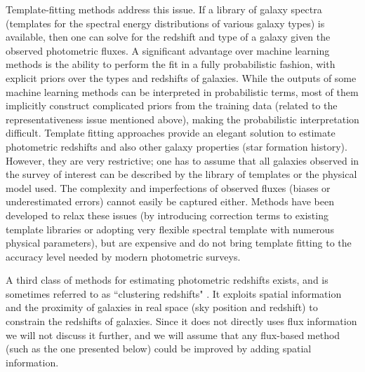 \documentclass[aps,prd,showpacs,superscriptaddress,groupedaddress]{revtex4}  %
\begin{document}
Template-fitting methods \citep[\eg][]{Benitez:1998br, Brammer:2008qv, Feldmann:2006wg}  address this issue. 
If a library of galaxy spectra (\ie templates for the spectral energy distributions of various galaxy types) is available, then one can solve for the redshift and type of a galaxy given the observed photometric fluxes.
A significant advantage over machine learning methods is the ability to perform the fit in a fully probabilistic fashion, with explicit priors over the types and redshifts of galaxies.
While the outputs of some machine learning methods can be interpreted in probabilistic terms, most of them implicitly construct complicated priors from the training data (related to the representativeness issue mentioned above), making the probabilistic interpretation difficult.
Template fitting approaches provide an elegant solution to estimate photometric redshifts and also other galaxy properties (\eg star formation history).
However, they are very restrictive; one has to assume that all galaxies observed in the survey of interest can be described by the library of templates or the physical model used. 
The complexity and imperfections of observed fluxes (\eg biases or underestimated errors) cannot easily be captured either.
Methods have been developed to relax these issues (\eg by introducing correction terms to existing template libraries or adopting very flexible spectral template with numerous physical parameters), but are expensive and do not bring template fitting to the accuracy level needed by modern photometric surveys.

A third class of methods for estimating photometric redshifts exists, and is sometimes referred to as ``clustering redshifts" \citep[\eg][]{Matthews:2010an}.
It exploits spatial information and the proximity of galaxies in real space (sky position and redshift) to constrain the redshifts of galaxies.
Since it does not directly uses flux information we will not discuss it further, and we will assume that any flux-based \photoz method (such as the one presented below) could be improved by adding spatial information.
\end{document}

